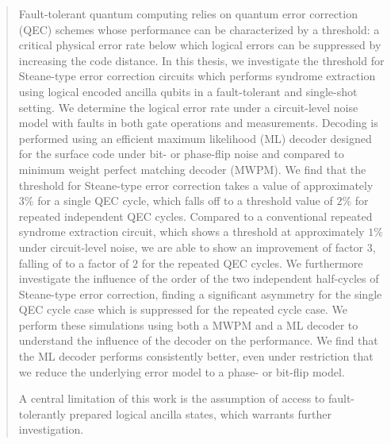 \begin{abstract}

Fault-tolerant quantum computing relies on quantum error correction (QEC) schemes whose performance can be characterized by a threshold: 
a critical physical error rate below which logical errors can be suppressed by increasing the code distance. 
In this thesis, we investigate the threshold for Steane-type error correction circuits which performs syndrome extraction using logical encoded ancilla qubits in a fault-tolerant and single-shot setting.
We determine the logical error rate under a circuit-level noise model with faults in both gate operations and measurements.
Decoding is performed using an efficient maximum likelihood (ML) decoder designed for the surface code under bit- or phase-flip noise and compared to minimum weight perfect matching decoder (MWPM). 
We find that the threshold for Steane-type error correction takes a value of approximately $3\%$ for a single QEC cycle, 
which falls off to a threshold value of $2\%$ for repeated independent QEC cycles.
Compared to a conventional repeated syndrome extraction circuit, which shows a threshold at approximately $1\%$ under circuit-level noise,
we are able to show an improvement of factor $3$, falling of to a factor of $2$ for the repeated QEC cycles. 
We furthermore investigate the influence of the order of the two independent half-cycles of Steane-type error correction, 
finding a significant asymmetry for the single QEC cycle case which is suppressed for the repeated cycle case. 
We perform these simulations using both a MWPM and a ML decoder to understand the influence of the decoder on the performance. 
We find that the ML decoder performs consistently better, even under restriction that we reduce the underlying error model to a phase- or bit-flip model. 

A central limitation of this work is the assumption of access to fault-tolerantly prepared logical ancilla states, which warrants further investigation.

\end{abstract}
